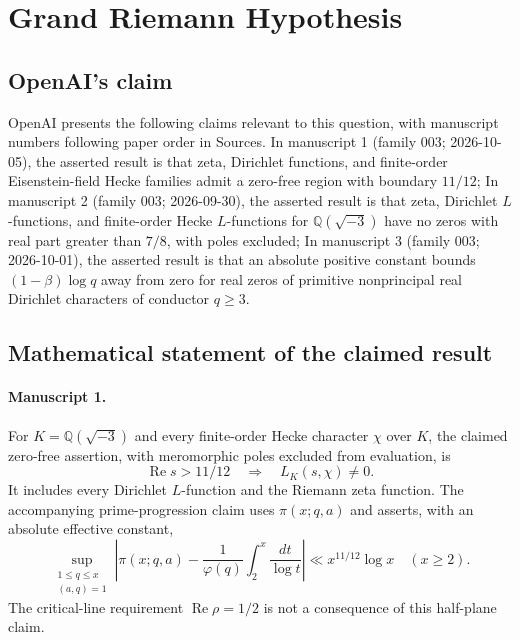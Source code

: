\documentclass[11pt]{article}
\begin{document}
\section*{Grand Riemann Hypothesis}

\subsection{OpenAI's claim}
OpenAI presents the following claims relevant to this question, with manuscript numbers following paper order in Sources. In manuscript 1 (family 003; 2026-10-05), the asserted result is that zeta, Dirichlet functions, and finite-order Eisenstein-field Hecke families admit a zero-free region with boundary $11/12$; In manuscript 2 (family 003; 2026-09-30), the asserted result is that zeta, Dirichlet $L$-functions, and finite-order Hecke $L$-functions for $\mathbb Q(\sqrt{-3})$ have no zeros with real part greater than $7/8$, with poles excluded; In manuscript 3 (family 003; 2026-10-01), the asserted result is that an absolute positive constant bounds $(1-\beta)\log q$ away from zero for real zeros of primitive nonprincipal real Dirichlet characters of conductor $q\ge3$.

\subsection{Mathematical statement of the claimed result}
\paragraph{Manuscript 1.}
For $K=\mathbb Q(\sqrt{-3})$ and every finite-order Hecke character $\chi$ over $K$, the claimed zero-free assertion, with meromorphic poles excluded from evaluation, is
\[
 \operatorname{Re}s>11/12\quad\Longrightarrow\quad L_K(s,\chi)\ne0.
\]
It includes every Dirichlet $L$-function and the Riemann zeta function. The accompanying prime-progression claim uses $\pi(x;q,a)$ and asserts, with an absolute effective constant,
\[
 \sup_{\substack{1\le q\le x\\(a,q)=1}}
 \left|\pi(x;q,a)-\frac1{\varphi(q)}\int_2^x\frac{dt}{\log t}\right|
 \ll x^{11/12}\log x\quad(x\ge2).
\]
The critical-line requirement $\operatorname{Re}\rho=1/2$ is not a consequence of this half-plane claim.
\end{document}
